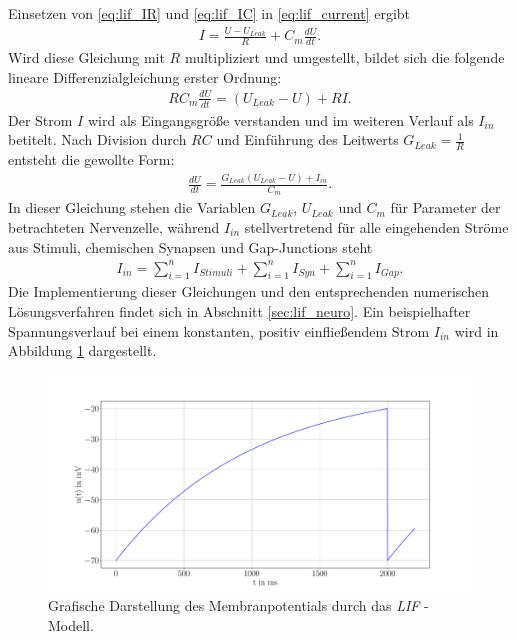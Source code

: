 	Einsetzen von \eqref{eq:lif_IR} und \eqref{eq:lif_IC} in \eqref{eq:lif_current} ergibt
	\begin{align}
		\label{eq:lif_I}
		I = \frac{U - U_{Leak}}{R} + C_m\frac{dU}{dt}\text{.}
	\end{align}
	Wird diese Gleichung mit $R$ multipliziert und umgestellt, bildet sich die folgende lineare Differenzialgleichung erster Ordnung:
	\begin{align}
		\label{eq:lif_nd}
		R C_m \frac{dU}{dt} = (U_{Leak} - U) + R I\text{.}
	\end{align}
	Der Strom $I$ wird als Eingangsgröße verstanden und im weiteren Verlauf als $I_{in}$ betitelt. Nach Division durch $RC$ und Einführung des Leitwerts $G_{Leak} = \tfrac{1}{R}$ entsteht die gewollte Form:
	\begin{align}
		\label{eq:lif}
		\frac{dU}{dt} = \frac{G_{Leak}(U_{Leak} - U) + I_{in}}{C_m}\text{.}
	\end{align}
	In dieser Gleichung stehen die Variablen $G_{Leak}$, $U_{Leak}$ und $C_m$ für Parameter der betrachteten Nervenzelle, während $I_{in}$ stellvertretend für alle eingehenden Ströme aus Stimuli, chemischen Synapsen und Gap-Junctions steht
	\begin{align}
		\label{eq:lif_current_in}
		I_{in} = \sum_{i = 1}^{n}{I_{Stimuli}} + \sum_{i = 1}^{n}{I_{Syn}} + \sum_{i = 1}^{n}{I_{Gap}}\text{.}
	\end{align}
	Die Implementierung dieser Gleichungen und den entsprechenden numerischen Lösungsverfahren findet sich in Abschnitt \ref{sec:lif_neuro}. Ein beispielhafter Spannungsverlauf bei einem konstanten, positiv einfließendem Strom $I_{in}$ wird in Abbildung \ref{fig:simple_lif} dargestellt.
	\begin{figure}[H]
		\centering
		\includegraphics[width=15cm]{figures/chap_lif/Simple_LIF.pdf}
		\caption{Grafische Darstellung des Membranpotentials durch das \textit{LIF} - Modell.}
		\label{fig:simple_lif}
	\end{figure}
